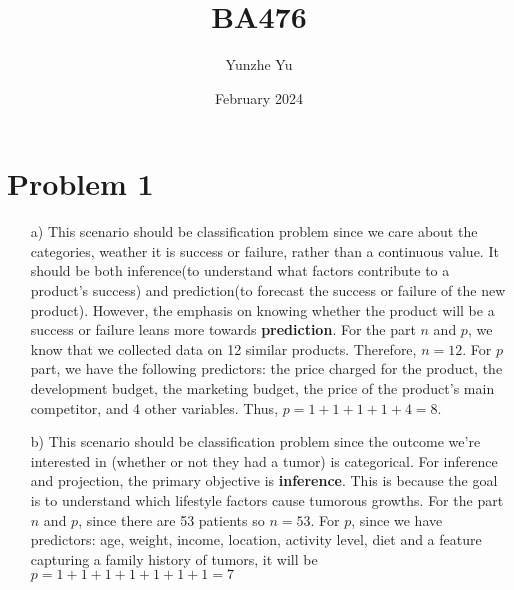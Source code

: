 \documentclass{article}
\title{BA476}
\author{Yunzhe Yu}
\date{February 2024}
\begin{document}
\maketitle

\section*{Problem 1}
    \begin{itemize}
        \item [a)]
            This scenario should be classification problem since we care about the categories, weather it is success or failure, rather than a continuous value. It should be both inference(to understand what factors contribute to a product's success) and prediction(to forecast the success or failure of the new product). However, the emphasis on knowing whether the product will be a success or failure leans more towards \textbf{prediction}. For the part $n$ and $p$, we know that we collected data on 12 similar products. Therefore, $n = 12$. For $p$ part, we have the following predictors: the price charged for the product, the development budget, the marketing budget, the price of the product’s main competitor, and 4 other variables. Thus, $p = 1 + 1 + 1 + 1 + 4 = 8$.

        \item[b)]
            This scenario should be classification problem since  the outcome we're interested in (whether or not they had a tumor) is categorical. For inference and projection, the primary objective is \textbf{inference}. This is because the goal is to understand which lifestyle factors cause tumorous growths. For the part $n$ and $p$, since there are 53 patients so $n = 53$. For $p$, since we have predictors: age, weight, income, location, activity level, diet and a feature capturing a family history of tumors, it will be $p = 1 + 1 + 1 + 1 + 1 +1 + 1 = 7$
    \end{itemize}
    \newpage
\end{document}
